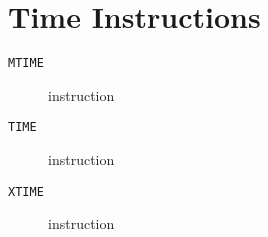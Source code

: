 \section{Time Instructions}
\begin{description}
\item[\texttt{MTIME}] instruction\\

\end{description}
\clearpage
\begin{description}
\item[\texttt{TIME}] instruction\\

\end{description}
\clearpage
\begin{description}
\item[\texttt{XTIME}] instruction\\

\end{description}
\clearpage
